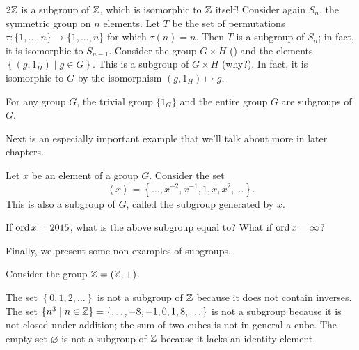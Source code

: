 \begin{example}
	\listhack
	\begin{enumerate}[(a) ]
		\ii $2\mathbb Z$ is a subgroup of $\mathbb Z$, which is isomorphic to $\mathbb Z$ itself!
		\ii Consider again $S_n$, the symmetric group on $n$ elements.
		Let $T$ be the set of permutations $\tau \colon \{1, \dots, n\} \to \{1, \dots, n\}$
		for which $\tau(n) = n$.  Then $T$ is a subgroup of $S_n$;
		in fact, it is isomorphic to $S_{n-1}$.
		\ii Consider the group $G \times H$ ()
		and the elements $ \left\{ (g, 1_H) \mid g \in G \right\} $.
		This is a subgroup of $G \times H$ (why?).
		In fact, it is isomorphic to $G$
		by the isomorphism $(g,1_H) \mapsto g$.
	\end{enumerate}
\end{example}
\begin{example}
	For any group $G$, the trivial group $\{1_G\}$
	and the entire group $G$ are subgroups of $G$.
\end{example}

Next is an especially important example that we'll talk about more in later chapters.
\begin{example}
	Let $x$ be an element of a group $G$.
	Consider the set
	\[ \left<x\right> = \left\{ \dots, x^{-2}, x^{-1}, 1, x, x^2, \dots \right\}. \]
	This is also a subgroup of $G$, called the subgroup generated by $x$.
\end{example}
\begin{exercise}
	If $\operatorname{ord} x = 2015$, what is the above subgroup equal to?
	What if $\operatorname{ord} x = \infty$?
\end{exercise}

Finally, we present some non-examples of subgroups.
\begin{example}
	Consider the group $\mathbb Z = (\mathbb Z, +)$.
	\begin{enumerate}[(a)]
		\ii The set $\left\{ 0,1,2,\dots \right\}$ is
		not a subgroup of $\mathbb Z$ because it does not contain inverses.
		\ii The set $\{ n^3 \mid n \in \mathbb Z \}
		= \{ \dots, -8, -1, 0, 1, 8, \dots \}$ is not a subgroup
		because it is not closed under addition;
		the sum of two cubes is not in general a cube.
		\ii The empty set $\varnothing$ is not a subgroup
		of $\mathbb Z$ because it lacks an identity element.
	\end{enumerate}
\end{example}

